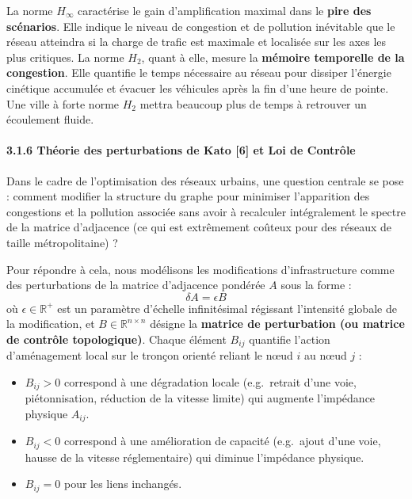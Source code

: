 \documentclass[10pt, a4paper]{article}
\providecommand{\tightlist}{}
\begin{document}
La norme \(H_\infty\) caractérise le gain d'amplification maximal dans
le \textbf{pire des scénarios}. Elle indique le niveau de congestion et
de pollution inévitable que le réseau atteindra si la charge de trafic
est maximale et localisée sur les axes les plus critiques. La norme
\(H_2\), quant à elle, mesure la \textbf{mémoire temporelle de la
congestion}. Elle quantifie le temps nécessaire au réseau pour dissiper
l'énergie cinétique accumulée et évacuer les véhicules après la fin
d'une heure de pointe. Une ville à forte norme \(H_2\) mettra beaucoup
plus de temps à retrouver un écoulement fluide.

\paragraph{3.1.6 Théorie des perturbations de Kato {[}6{]} et Loi de
Contrôle}\label{thuxe9orie-des-perturbations-de-kato-6-et-loi-de-contruxf4le}

Dans le cadre de l'optimisation des réseaux urbains, une question
centrale se pose : comment modifier la structure du graphe pour
minimiser l'apparition des congestions et la pollution associée sans
avoir à recalculer intégralement le spectre de la matrice d'adjacence
(ce qui est extrêmement coûteux pour des réseaux de taille
métropolitaine) ?

Pour répondre à cela, nous modélisons les modifications d'infrastructure
comme des perturbations de la matrice d'adjacence pondérée \(A\) sous la
forme : \[\delta A = \epsilon B\] où \(\epsilon \in \mathbb{R}^+\) est
un paramètre d'échelle infinitésimal régissant l'intensité globale de la
modification, et \(B \in \mathbb{R}^{n \times n}\) désigne la
\textbf{matrice de perturbation (ou matrice de contrôle topologique)}.
Chaque élément \(B_{ij}\) quantifie l'action d'aménagement local sur le
tronçon orienté reliant le nœud \(i\) au nœud \(j\) :

\begin{itemize}
\tightlist
\item
  \(B_{ij} > 0\) correspond à une dégradation locale (e.g.~retrait d'une
  voie, piétonnisation, réduction de la vitesse limite) qui augmente
  l'impédance physique \(A_{ij}\).
\item
  \(B_{ij} < 0\) correspond à une amélioration de capacité (e.g.~ajout
  d'une voie, hausse de la vitesse réglementaire) qui diminue
  l'impédance physique.
\item
  \(B_{ij} = 0\) pour les liens inchangés.
\end{itemize}
\end{document}
